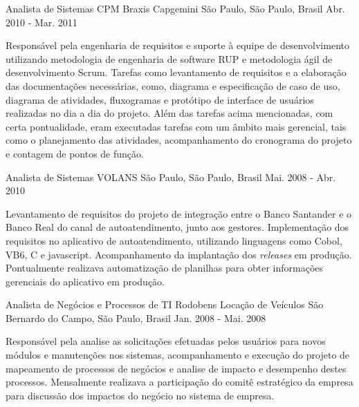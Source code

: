 \begin{cventries}
  \cventry
    {Analista de Sistemas} %
    {CPM Braxis Capgemini} %
    {São Paulo, São Paulo, Brasil} %
    {Abr. 2010 - Mar. 2011} %
    {
      \begin{cvitems} %
        \item {Responsável pela engenharia de requisitos e suporte à equipe de desenvolvimento utilizando metodologia de engenharia de software RUP e metodologia ágil de desenvolvimento Scrum. Tarefas como levantamento de requisitos e a elaboração das documentações necessárias, como, diagrama e especificação de caso de uso, diagrama de atividades, fluxogramas e protótipo de interface de usuários realizadas no dia a dia do projeto. Além das tarefas acima mencionadas, com certa pontualidade, eram executadas tarefas com um âmbito mais gerencial, tais como o planejamento das atividades, acompanhamento do cronograma do projeto e contagem de pontos de função.}
      \end{cvitems}
    }

  \cventry
    {Analista de Sistemas} %
    {VOLANS} %
    {São Paulo, São Paulo, Brasil} %
    {Mai. 2008 - Abr. 2010} %
    {
      \begin{cvitems} %
        \item {Levantamento de requisitos do projeto de integração entre o Banco Santander e o Banco Real do canal de autoatendimento, junto aos gestores. Implementação dos requisitos no aplicativo de autoatendimento, utilizando linguagens como Cobol, VB6, C e javascript. Acompanhamento da implantação dos \textit{releases} em produção. Pontualmente realizava automatização de planilhas para obter informações gerenciais do aplicativo em produção.}
      \end{cvitems}
    }

  \cventry
    {Analista de Negócios e Processos de TI} %
    {Rodobens Locação de Veículos} %
    {São Bernardo do Campo, São Paulo, Brasil} %
    {Jan. 2008 - Mai. 2008} %
    {
      \begin{cvitems} %
        \item {Responsável pela analise as solicitações efetuadas pelos usuários para novos módulos e manutenções nos sistemas, acompanhamento e execução do projeto de mapeamento de processos de negócios e analise de impacto e desempenho destes processos. Mensalmente realizava a participação do comitê estratégico da empresa para discussão dos impactos do negócio no sistema de empresa.}
      \end{cvitems}
    }


\end{cventries}
